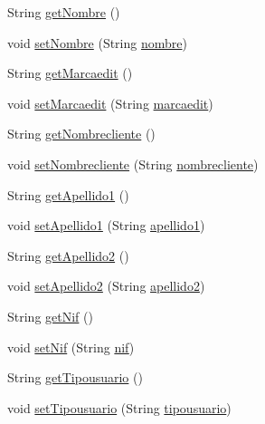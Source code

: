 \begin{DoxyCompactItemize}
String \mbox{\hyperlink{classlibreria_1_1_factura_aeae223296a430d8ad41d930d52036386}{get\+Nombre}} ()
\item 
void \mbox{\hyperlink{classlibreria_1_1_factura_a1593e1be1d82b76a3ad751efbfc82cab}{set\+Nombre}} (String \mbox{\hyperlink{classlibreria_1_1_factura_acd12a84d167767add71cac38d219088f}{nombre}})
\item 
String \mbox{\hyperlink{classlibreria_1_1_factura_ab9583cbafe8cd4cefd635541f8bbee25}{get\+Marcaedit}} ()
\item 
void \mbox{\hyperlink{classlibreria_1_1_factura_aeef83df1d8b190938fe112bff6e0a224}{set\+Marcaedit}} (String \mbox{\hyperlink{classlibreria_1_1_factura_a71087e2afc07fab380ed309a19577cec}{marcaedit}})
\item 
String \mbox{\hyperlink{classlibreria_1_1_factura_a3a2fedf78cd48aab33bac9536d4db307}{get\+Nombrecliente}} ()
\item 
void \mbox{\hyperlink{classlibreria_1_1_factura_a62c6a5c605af26f453bbdc5d7dfeb430}{set\+Nombrecliente}} (String \mbox{\hyperlink{classlibreria_1_1_factura_a6a9dc56e42e06f7928de4c51bff30443}{nombrecliente}})
\item 
String \mbox{\hyperlink{classlibreria_1_1_factura_a3149edc75ba95ce3c4926c6927fb632b}{get\+Apellido1}} ()
\item 
void \mbox{\hyperlink{classlibreria_1_1_factura_a38bd737d6cd3fa8070c84fb87b548640}{set\+Apellido1}} (String \mbox{\hyperlink{classlibreria_1_1_factura_a83e5ee3edddf7c91a71605ea4eeb9d5f}{apellido1}})
\item 
String \mbox{\hyperlink{classlibreria_1_1_factura_a975f44149ea7ba75f8b5e596bbd6631a}{get\+Apellido2}} ()
\item 
void \mbox{\hyperlink{classlibreria_1_1_factura_a038d2a6661552518ce48ed8982fa2781}{set\+Apellido2}} (String \mbox{\hyperlink{classlibreria_1_1_factura_af91345af6a4d1ae15efc26bd3ef29524}{apellido2}})
\item 
String \mbox{\hyperlink{classlibreria_1_1_factura_aa27c8a4c3978ca28dcccd7581b4eb493}{get\+Nif}} ()
\item 
void \mbox{\hyperlink{classlibreria_1_1_factura_ad2e689e4a7d63abe394f6a3f043afdb7}{set\+Nif}} (String \mbox{\hyperlink{classlibreria_1_1_factura_a13e68de98d752d7226ca9107446075ec}{nif}})
\item 
String \mbox{\hyperlink{classlibreria_1_1_factura_aaa2a5a03568785443f16ce0cb29f9e27}{get\+Tipousuario}} ()
\item 
void \mbox{\hyperlink{classlibreria_1_1_factura_aa4fe695e4460b4268f1e09254bd7f1b5}{set\+Tipousuario}} (String \mbox{\hyperlink{classlibreria_1_1_factura_a79b1b03330788462f7659fc11e6374fc}{tipousuario}})
\end{DoxyCompactItemize}
